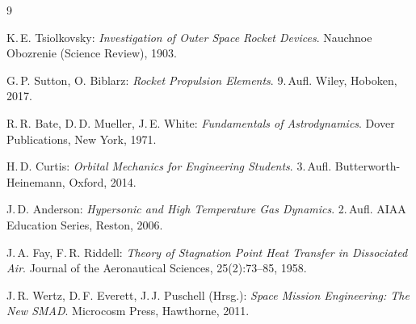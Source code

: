 ﻿\documentclass[12pt,a4paper]{article}
\begin{document}
\begin{thebibliography}{9}

K.\,E. Tsiolkovsky:
\textit{Investigation of Outer Space Rocket Devices}.
Nauchnoe Obozrenie (Science Review), 1903.

G.\,P. Sutton, O. Biblarz:
\textit{Rocket Propulsion Elements}.
9.\,Aufl. Wiley, Hoboken, 2017.

R.\,R. Bate, D.\,D. Mueller, J.\,E. White:
\textit{Fundamentals of Astrodynamics}.
Dover Publications, New York, 1971.

H.\,D. Curtis:
\textit{Orbital Mechanics for Engineering Students}.
3.\,Aufl. Butterworth-Heinemann, Oxford, 2014.

J.\,D. Anderson:
\textit{Hypersonic and High Temperature Gas Dynamics}.
2.\,Aufl. AIAA Education Series, Reston, 2006.

J.\,A. Fay, F.\,R. Riddell:
\textit{Theory of Stagnation Point Heat Transfer in Dissociated Air}.
Journal of the Aeronautical Sciences, 25(2):73--85, 1958.

J.\,R. Wertz, D.\,F. Everett, J.\,J. Puschell (Hrsg.):
\textit{Space Mission Engineering: The New SMAD}.
Microcosm Press, Hawthorne, 2011.

\end{thebibliography}
\end{document}
